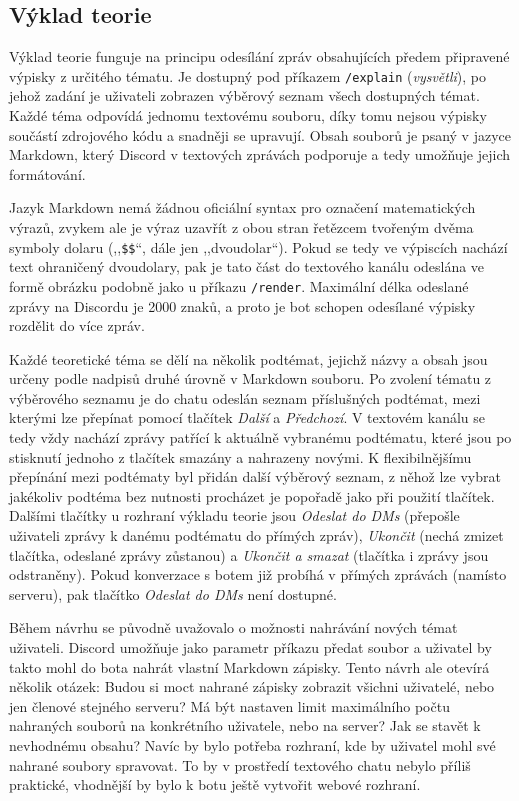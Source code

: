 \documentclass[FM]{tulthesis}
\begin{document}
	\subsection{Výklad teorie}
	
	Výklad teorie funguje na principu odesílání zpráv obsahujících předem připravené výpisky z určitého tématu. Je dostupný pod příkazem \verb|/explain| (\textit{vysvětli}), po jehož zadání je uživateli zobrazen výběrový seznam všech dostupných témat. Každé téma odpovídá jednomu textovému souboru, díky tomu nejsou výpisky součástí zdrojového kódu a snadněji se upravují. Obsah souborů je psaný v jazyce Markdown, který Discord v textových zprávách podporuje a tedy umožňuje jejich formátování.
	
	Jazyk Markdown nemá žádnou oficiální syntax pro označení matematických výrazů, zvykem ale je výraz uzavřít z obou stran řetězcem tvořeným dvěma symboly dolaru (,,\verb|$$|``, dále jen ,,dvoudolar``). Pokud se tedy ve výpiscích nachází text ohraničený dvoudolary, pak je tato část do textového kanálu odeslána ve formě obrázku podobně jako u příkazu \verb|/render|. Maximální délka odeslané zprávy na Discordu je 2000 znaků, a proto je bot schopen odesílané výpisky rozdělit do více zpráv. %
	
	Každé teoretické téma se dělí na několik podtémat, jejichž názvy a obsah jsou určeny podle nadpisů druhé úrovně v Markdown souboru. Po zvolení tématu z výběrového seznamu je do chatu odeslán seznam příslušných podtémat, mezi kterými lze přepínat pomocí tlačítek \textit{Další} a \textit{Předchozí}. V textovém kanálu se tedy vždy nachází zprávy patřící k aktuálně vybranému podtématu, které jsou po stisknutí jednoho z tlačítek smazány a nahrazeny novými. K flexibilnějšímu přepínání mezi podtématy byl přidán další výběrový seznam, z něhož lze vybrat jakékoliv podtéma bez nutnosti procházet je popořadě jako při použití tlačítek. Dalšími tlačítky u rozhraní výkladu teorie jsou \textit{Odeslat do DMs} (přepošle uživateli zprávy k danému podtématu do přímých zpráv), \textit{Ukončit} (nechá zmizet tlačítka, odeslané zprávy zůstanou) a \textit{Ukončit a smazat} (tlačítka i zprávy jsou odstraněny). Pokud konverzace s botem již probíhá v přímých zprávách (namísto serveru), pak tlačítko \textit{Odeslat do DMs} není dostupné.
	
	Během návrhu se původně uvažovalo o možnosti nahrávání nových témat uživateli. Discord umožňuje jako parametr příkazu předat soubor a uživatel by takto mohl do bota nahrát vlastní Markdown zápisky. Tento návrh ale otevírá několik otázek: Budou si moct nahrané zápisky zobrazit všichni uživatelé, nebo jen členové stejného serveru? Má být nastaven limit maximálního počtu nahraných souborů na konkrétního uživatele, nebo na server? Jak se stavět k nevhodnému obsahu? Navíc by bylo potřeba rozhraní, kde by uživatel mohl své nahrané soubory spravovat. To by v prostředí textového chatu nebylo příliš praktické, vhodnější by bylo k botu ještě vytvořit webové rozhraní.
	
\end{document}
